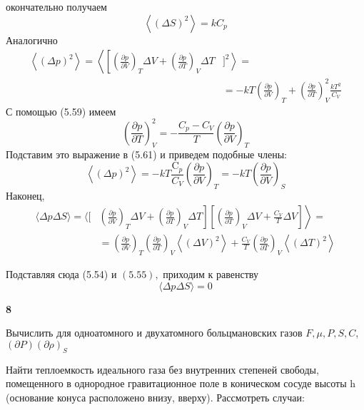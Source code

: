 \documentclass[a4paper,12pt]{article} %
\begin{document}
\begin{ttask}
окончательно получаем
$$
\left\langle(\Delta S)^{2}\right\rangle=k C_{p}
$$
Аналогично
$$
\begin{aligned}
\left\langle(\Delta p)^{2}\right\rangle=\left\langle\left[\left(\frac{\partial p}{\partial V}\right)_{T} \Delta V+\left(\frac{\partial p}{\partial T}\right)_{V} \Delta T\right.\right.&\left.]^{2}\right\rangle=\\
&=-k T\left(\frac{\partial p}{\partial V}\right)_{T}+\left(\frac{\partial p}{\partial T}\right)_{V}^{2} \frac{k T^{2}}{C_{V}}
\end{aligned}
$$
С помощью (5.59) имеем
$$
\left(\frac{\partial p}{\partial T}\right)_{V}^{2}=-\frac{C_{p}-C_{V}}{T}\left(\frac{\partial p}{\partial V}\right)_{T}
$$
Подставим это выражение в (5.61) и приведем подобные члены:
$$
\left\langle(\Delta p)^{2}\right\rangle=-k T \frac{\mathrm{C}_{p}}{C_{V}}\left(\frac{\partial p}{\partial V}\right)_{T}=-k T\left(\frac{\partial p}{\partial V}\right)_{S}
$$
Наконец,
$$
\begin{aligned}
\langle\Delta p \Delta S\rangle=\langle[&\left.\left.\left(\frac{\partial p}{\partial V}\right)_{T} \Delta V+\left(\frac{\partial p}{\partial T}\right)_{V} \Delta T\right]\left[\left(\frac{\partial p}{\partial T}\right)_{V} \Delta V+\frac{C_{V}}{T} \Delta V\right]\right\rangle=\\
&=\left(\frac{\partial p}{\partial V}\right)_{T}\left(\frac{\partial p}{\partial T}\right)_{V}\left\langle(\Delta V)^{2}\right\rangle+\frac{C_{V}}{T}\left(\frac{\partial p}{\partial T}\right)_{V}\left\langle(\Delta T)^{2}\right\rangle
\end{aligned}
$$

Подставляя сюда (5.54) и $(5.55),$ приходим к равенству
$$
\langle\Delta p \Delta S\rangle=0
$$



\end{ttask}


\begin{ttask}\textbf{8}

Вычислить для одноатомного и двухатомного больцмановских газов 
$ F, \mu, P, S, C$, $(\partial P)(\partial \rho)_{S}$




\end{ttask}


\begin{ttask}

Найти теплоемкость идеального газа без внутренних степеней свободы, помещенного в однородное гравитационное поле в коническом сосуде высоты h (основание конуса расположено внизу, вверху). Рассмотреть случаи:



\end{ttask}
\end{document}
